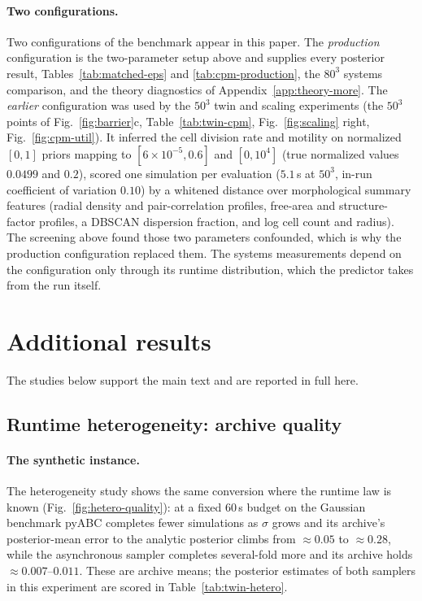\documentclass[10pt]{article}
\theoremstyle{plain}
\theoremstyle{definition}
\begin{document}
\paragraph{Two configurations.} Two configurations of the benchmark appear in this paper. The \emph{production} configuration is the two-parameter setup above and supplies every posterior result, Tables~\ref{tab:matched-eps} and \ref{tab:cpm-production}, the $80^3$ systems comparison, and the theory diagnostics of Appendix~\ref{app:theory-more}. The \emph{earlier} configuration was used by the $50^3$ twin and scaling experiments (the $50^3$ points of Fig.~\ref{fig:barrier}c, Table~\ref{tab:twin-cpm}, Fig.~\ref{fig:scaling} right, Fig.~\ref{fig:cpm-util}). It inferred the cell division rate and motility on normalized $[0,1]$ priors mapping to $[6{\times}10^{-5},0.6]$ and $[0,10^4]$ (true normalized values $0.0499$ and $0.2$), scored one simulation per evaluation ($5.1$\,s at $50^3$, in-run coefficient of variation $0.10$) by a whitened distance over morphological summary features (radial density and pair-correlation profiles, free-area and structure-factor profiles, a DBSCAN dispersion fraction, and log cell count and radius). The screening above found those two parameters confounded, which is why the production configuration replaced them. The systems measurements depend on the configuration only through its runtime distribution, which the predictor takes from the run itself.

\section{Additional results}\label{app:moved}
The studies below support the main text and are reported in full here.

\subsection{Runtime heterogeneity: archive quality}

\paragraph{The synthetic instance.} The heterogeneity study shows the same conversion where the runtime law is known (Fig.~\ref{fig:hetero-quality}): at a fixed $60$\,s budget on the Gaussian benchmark pyABC completes fewer simulations as $\sigma$ grows and its archive's posterior-mean error to the analytic posterior climbs from ${\approx}0.05$ to ${\approx}0.28$, while the asynchronous sampler completes several-fold more and its archive holds ${\approx}0.007$--$0.011$. These are archive means; the posterior estimates of both samplers in this experiment are scored in Table~\ref{tab:twin-hetero}.
\end{document}
